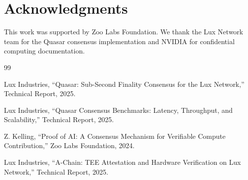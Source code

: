 \section*{Acknowledgments}


This work was supported by Zoo Labs Foundation. We thank the Lux Network team for the Quasar consensus implementation and NVIDIA for confidential computing documentation.


\begin{thebibliography}{99}

Lux Industries, ``Quasar: Sub-Second Finality Consensus for the Lux Network,'' Technical Report, 2025.

Lux Industries, ``Quasar Consensus Benchmarks: Latency, Throughput, and Scalability,'' Technical Report, 2025.

Z. Kelling, ``Proof of AI: A Consensus Mechanism for Verifiable Compute Contribution,'' Zoo Labs Foundation, 2024.

Lux Industries, ``A-Chain: TEE Attestation and Hardware Verification on Lux Network,'' Technical Report, 2025.

\end{thebibliography}

